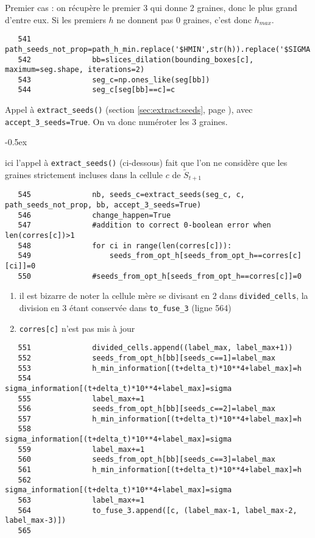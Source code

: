 \documentclass{article}
\def \mycolor {red}
\begin{document}
\color{\mycolor}
Premier cas : on r\'ecup\`ere le premier $3$ qui donne 2 graines, donc le plus grand d'entre eux. Si les premiers $h$ ne donnent pas $0$ graines, c'est donc $h_{max}$.
\color{black}
\begin{verbatim} 
   541	            path_seeds_not_prop=path_h_min.replace('$HMIN',str(h)).replace('$SIGMA',str(sigma));
   542	            bb=slices_dilation(bounding_boxes[c], maximum=seg.shape, iterations=2)
   543	            seg_c=np.ones_like(seg[bb])
   544	            seg_c[seg[bb]==c]=c
\end{verbatim} 
\color{\mycolor}
Appel \`a \texttt{extract\_seeds()} (section \ref{sec:extract:seeds}, page \pageref{sec:extract:seeds}), avec \verb| accept_3_seeds=True|. On va donc num\'eroter les 3 graines.
\begin{description}
\itemsep -0.5ex
\item[ATTENTION :] ici l'appel \`a \verb|extract_seeds()| (ci-dessous) fait que l'on ne consid\`ere que les graines strictement incluses dans la cellule $c$ de $\tilde{S}_{t+1}$
\end{description}
\color{black}
\begin{verbatim}
   545	            nb, seeds_c=extract_seeds(seg_c, c, path_seeds_not_prop, bb, accept_3_seeds=True)
   546	            change_happen=True
   547	            #addition to correct 0-boolean error when len(corres[c])>1
   548	            for ci in range(len(corres[c])):
   549	                seeds_from_opt_h[seeds_from_opt_h==corres[c][ci]]=0
   550	            #seeds_from_opt_h[seeds_from_opt_h==corres[c]]=0
\end{verbatim} 
\color{\mycolor}
\begin{enumerate}
\item il est bizarre de noter la cellule m\`ere se divisant en 2 dans \verb|divided_cells|, la division en 3 \'etant conserv\'ee dans \verb|to_fuse_3| (ligne 564)
\item \verb|corres[c]| n'est pas mis \`a jour
\end{enumerate}
\color{black}
\begin{verbatim}
   551	            divided_cells.append((label_max, label_max+1))
   552	            seeds_from_opt_h[bb][seeds_c==1]=label_max
   553	            h_min_information[(t+delta_t)*10**4+label_max]=h
   554	            sigma_information[(t+delta_t)*10**4+label_max]=sigma
   555	            label_max+=1
   556	            seeds_from_opt_h[bb][seeds_c==2]=label_max
   557	            h_min_information[(t+delta_t)*10**4+label_max]=h
   558	            sigma_information[(t+delta_t)*10**4+label_max]=sigma
   559	            label_max+=1
   560	            seeds_from_opt_h[bb][seeds_c==3]=label_max
   561	            h_min_information[(t+delta_t)*10**4+label_max]=h
   562	            sigma_information[(t+delta_t)*10**4+label_max]=sigma
   563	            label_max+=1
   564	            to_fuse_3.append([c, (label_max-1, label_max-2, label_max-3)])
   565	
\end{verbatim} 
\end{document}
